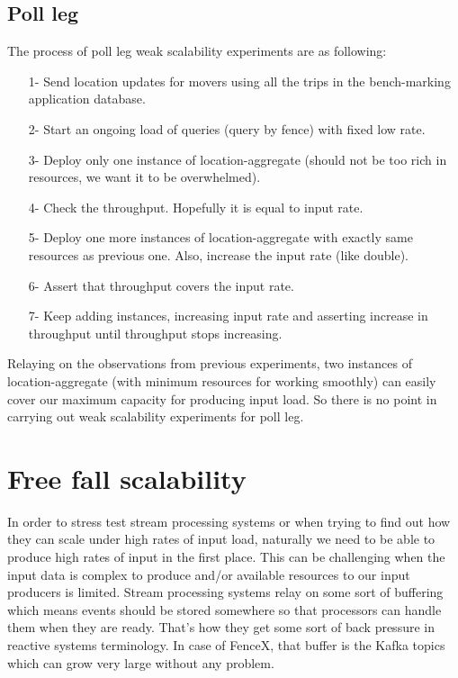 \documentclass[a4]{report}
\begin{document}
        \subsection{Poll leg}
        The process of poll leg weak scalability experiments are as following:
        \begin{itemize}
            \item[1-] Send location updates for movers using all the trips in the bench-marking application database.
            \item[2-] Start an ongoing load of queries (query by fence) with fixed low rate.
            \item[3-] Deploy only one instance of location-aggregate (should not be too rich in resources, we want it to
            be overwhelmed).
            \item[4-] Check the throughput. Hopefully it is equal to input rate.
            \item[5-] Deploy one more instances of location-aggregate with exactly same resources as previous one. Also,
            increase the input rate (like double).
            \item[6-] Assert that throughput covers the input rate.
            \item[7-] Keep adding instances, increasing input rate and asserting increase in throughput until throughput
            stops increasing.
        \end{itemize}

        Relaying on the observations from previous experiments, two instances of location-aggregate (with minimum
        resources for working smoothly) can easily cover our maximum capacity for producing input load.
        So there is no point in carrying out weak scalability experiments for poll leg.


        \section{Free fall scalability}
        In order to stress test stream processing systems or when trying to find out how they can scale under high rates
        of input load, naturally we need to be able to produce high rates of input in the first place.
        This can be challenging when the input data is complex to produce and/or available resources to our input
        producers is limited.
        Stream processing systems relay on some sort of buffering which means events should be stored somewhere so
        that processors can handle them when they are ready.
        That's how they get some sort of back pressure in reactive systems terminology.
        In case of FenceX, that buffer is the Kafka topics which can grow very large without any problem.
\end{document}
